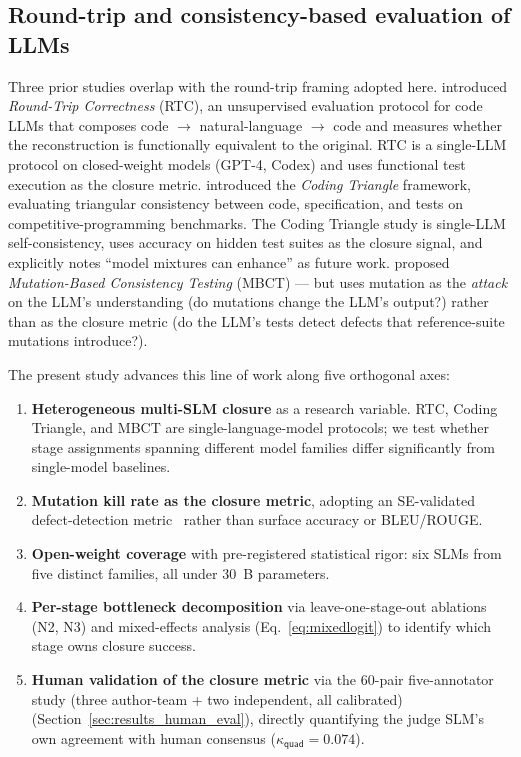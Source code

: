 \subsection{Round-trip and consistency-based evaluation of LLMs}

Three prior studies overlap with the round-trip framing adopted here. \citet{Allamanis2024RTC} introduced \emph{Round-Trip Correctness} (RTC), an unsupervised evaluation protocol for code LLMs that composes code $\to$ natural-language $\to$ code and measures whether the reconstruction is functionally equivalent to the original. RTC is a single-LLM protocol on closed-weight models (GPT-4, Codex) and uses functional test execution as the closure metric. \citet{Zhang2025CodingTriangle} introduced the \emph{Coding Triangle} framework, evaluating triangular consistency between code, specification, and tests on competitive-programming benchmarks. The Coding Triangle study is single-LLM self-consistency, uses accuracy on hidden test suites as the closure signal, and explicitly notes ``model mixtures can enhance'' as future work. \citet{Li2024MBCT} proposed \emph{Mutation-Based Consistency Testing} (MBCT) --- but uses mutation as the \emph{attack} on the LLM's understanding (do mutations change the LLM's output?) rather than as the closure metric (do the LLM's tests detect defects that reference-suite mutations introduce?).

The present study advances this line of work along five orthogonal axes:

\begin{enumerate}
  \item \textbf{Heterogeneous multi-SLM closure} as a research variable. RTC, Coding Triangle, and MBCT are single-language-model protocols; we test whether stage assignments spanning different model families differ significantly from single-model baselines.
  \item \textbf{Mutation kill rate as the closure metric}, adopting an SE-validated defect-detection metric~\citep{Andrews2005MutationAnalysis, Just2014MutationAnalysis} rather than surface accuracy or BLEU/ROUGE.
  \item \textbf{Open-weight coverage} with pre-registered statistical rigor: six SLMs from five distinct families, all under 30~B parameters.
  \item \textbf{Per-stage bottleneck decomposition} via leave-one-stage-out ablations (N2, N3) and mixed-effects analysis (Eq.~\ref{eq:mixedlogit}) to identify which stage owns closure success.
  \item \textbf{Human validation of the closure metric} via the 60-pair five-annotator study (three author-team + two independent, all calibrated) (Section~\ref{sec:results_human_eval}), directly quantifying the judge SLM's own agreement with human consensus ($\kappa_{\textsf{quad}} = 0.074$).
\end{enumerate}

